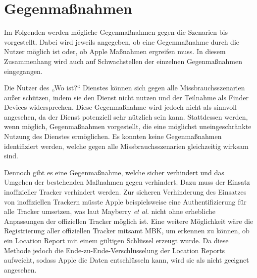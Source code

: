 \section{Gegenmaßnahmen}
\label{sec:Gegenmassnahmen}

Im Folgenden werden mögliche Gegenmaßnahmen gegen die Szenarien  bis  vorgestellt.
Dabei wird jeweils angegeben, ob eine Gegenmaßnahme durch die Nutzer möglich ist oder, ob Apple Maßnahmen ergreifen muss.
In diesem Zusammenhang wird auch auf Schwachstellen der einzelnen Gegenmaßnahmen eingegangen.

Die Nutzer des „Wo ist?“ Dienstes können sich gegen alle Missbrauchsszenarien außer  schützen, indem sie den Dienst nicht nutzen und der Teilnahme als Finder Devices widersprechen.
Diese Gegenmaßnahme wird jedoch nicht als sinnvoll angesehen, da der Dienst potenziell sehr nützlich sein kann.
Stattdessen werden, wenn möglich, Gegenmaßnahmen vorgestellt, die eine möglichst uneingeschränkte Nutzung des Dienstes ermöglichen.
Es konnten keine Gegenmaßnahmen identifiziert werden, welche gegen alle Missbrauchsszenarien gleichzeitig wirksam sind.

Dennoch gibt es eine Gegenmaßnahme, welche  sicher verhindert und das Umgehen der bestehenden Maßnahmen gegen  verhindert.
Dazu muss der Einsatz inoffizieller Tracker verhindert werden.
Zur sicheren Verhinderung des Einsatzes von inoffiziellen Trackern müsste Apple beispielsweise eine Authentifizierung für alle Tracker umsetzen, was laut Mayberry \textit{et al.} \cite{Mayberry_Tracking} nicht ohne erhebliche Anpassungen der offiziellen Tracker möglich ist.
Eine weitere Möglichkeit wäre die Registrierung aller offiziellen Tracker mitsamt \ac{MBK}, um erkennen zu können, ob ein Location Report mit einem gültigen Schlüssel erzeugt wurde.
Da diese Methode jedoch die Ende-zu-Ende-Verschlüsselung der Location Reports aufweicht, sodass Apple die Daten entschlüsseln kann, wird sie als nicht geeignet angesehen.


